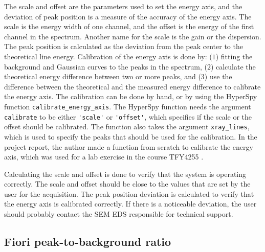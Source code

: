 The scale and offset are the parameters used to set the energy axis, and the deviation of peak position is a measure of the accuracy of the energy axis.
The scale is the energy width of one channel, and the offset is the energy of the first channel in the spectrum.
Another name for the scale is the gain or the dispersion.
The peak position is calculated as the deviation from the peak center to the theoretical line energy.
Calibration of the energy axis is done by: ($1$) fitting the background and Gaussian curves to the peaks in the spectrum, ($2$) calculate the theoretical energy difference between two or more peaks, and ($3$) use the difference between the theoretical and the measured energy difference to calibrate the energy axis.
The calibration can be done by hand, or by using the HyperSpy function \verb|calibrate_energy_axis|.
The HyperSpy function needs the argument \verb|calibrate| to be either \verb|'scale'| or \verb|'offset'|, which specifies if the scale or the offset should be calibrated.
The function also takes the argument \verb|xray_lines|, which is used to specify the peaks that should be used for the calibration.
In the project report, the author made a function from scratch to calibrate the energy axis, which was used for a lab exercise in the course TFY4255 \cite{project_report}.


Calculating the scale and offset is done to verify that the system is operating correctly.
The scale and offset should be close to the values that are set by the user for the acquisition.
The peak position deviation is calculated to verify that the energy axis is calibrated correctly.
If there is a noticeable deviation, the user should probably contact the SEM EDS responsible for technical support.






\subsection{Fiori peak-to-background ratio}
\label{theory:eds_performance:fiori}



